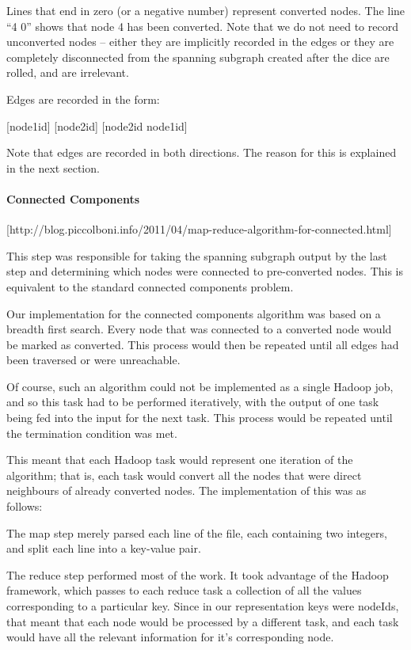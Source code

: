 Lines that end in zero (or a negative number) represent converted nodes. The line ``4 0'' shows that node 4 has been converted. Note that we do not need to record unconverted nodes -- either they are implicitly recorded in the edges or they are completely disconnected from the spanning subgraph created after the dice are rolled, and are irrelevant.

Edges are recorded in the form:

[node1id] [node2id]
[node2id node1id] 

Note that edges are recorded in both directions. The reason for this is explained in the next section.

\paragraph{Connected Components}
[http://blog.piccolboni.info/2011/04/map-reduce-algorithm-for-connected.html]

This step was responsible for taking the spanning subgraph output by the last step and determining which nodes were connected to pre-converted nodes. This is equivalent to the standard connected components problem.

Our implementation for the connected components algorithm was based on a breadth first search. Every node that was connected to a converted node would be marked as converted. This process would then be repeated until all edges had been traversed or were unreachable.

Of course, such an algorithm could not be implemented as a single Hadoop job, and so this task had to be performed iteratively, with the output of one task being fed into the input for the next task. This process would be repeated until the termination condition was met.

This meant that each Hadoop task would represent one iteration of the algorithm; that is, each task would convert all the nodes that were direct neighbours of already converted nodes. The implementation of this was as follows:

The map step merely parsed each line of the file, each containing two integers, and split each line into a key-value pair.

The reduce step performed most of the work. It took advantage of the Hadoop framework, which passes to each reduce task a collection of all the values corresponding to a particular key. Since in our representation keys were nodeIds, that meant that each node would be processed by a different task, and each task would have all the relevant information for it's corresponding node.

